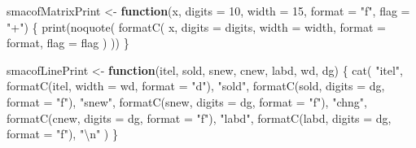 \documentclass[
  12pt,
  letterpaper,
  DIV=11,
  numbers=noendperiod]{scrartcl}
\newenvironment{Shaded}{\begin{snugshade}}{\end{snugshade}}
\newcommand{\AttributeTok}[1]{\textcolor[rgb]{0.40,0.45,0.13}{#1}}
\newcommand{\ControlFlowTok}[1]{\textcolor[rgb]{0.00,0.23,0.31}{\textbf{#1}}}
\newcommand{\DecValTok}[1]{\textcolor[rgb]{0.68,0.00,0.00}{#1}}
\newcommand{\FunctionTok}[1]{\textcolor[rgb]{0.28,0.35,0.67}{#1}}
\newcommand{\NormalTok}[1]{\textcolor[rgb]{0.00,0.23,0.31}{#1}}
\newcommand{\OtherTok}[1]{\textcolor[rgb]{0.00,0.23,0.31}{#1}}
\newcommand{\SpecialCharTok}[1]{\textcolor[rgb]{0.37,0.37,0.37}{#1}}
\newcommand{\StringTok}[1]{\textcolor[rgb]{0.13,0.47,0.30}{#1}}
\begin{document}
\begin{Shaded}
\begin{Highlighting}[]
\NormalTok{smacofMatrixPrint }\OtherTok{\textless{}{-}} \ControlFlowTok{function}\NormalTok{(x,}
                   \AttributeTok{digits =} \DecValTok{10}\NormalTok{,}
                   \AttributeTok{width =} \DecValTok{15}\NormalTok{,}
                   \AttributeTok{format =} \StringTok{"f"}\NormalTok{,}
                   \AttributeTok{flag =} \StringTok{"+"}\NormalTok{) \{}
  \FunctionTok{print}\NormalTok{(}\FunctionTok{noquote}\NormalTok{(}
    \FunctionTok{formatC}\NormalTok{(}
\NormalTok{      x,}
      \AttributeTok{digits =}\NormalTok{ digits,}
      \AttributeTok{width =}\NormalTok{ width,}
      \AttributeTok{format =}\NormalTok{ format,}
      \AttributeTok{flag =}\NormalTok{ flag}
\NormalTok{    )}
\NormalTok{  ))}
\NormalTok{\}}

\NormalTok{smacofLinePrint }\OtherTok{\textless{}{-}} \ControlFlowTok{function}\NormalTok{(itel, sold, snew, cnew, labd, wd, dg) \{}
  \FunctionTok{cat}\NormalTok{(}
    \StringTok{"itel"}\NormalTok{,}
    \FunctionTok{formatC}\NormalTok{(itel, }\AttributeTok{width =}\NormalTok{ wd, }\AttributeTok{format =} \StringTok{"d"}\NormalTok{),}
    \StringTok{"sold"}\NormalTok{,}
    \FunctionTok{formatC}\NormalTok{(sold, }\AttributeTok{digits =}\NormalTok{ dg, }\AttributeTok{format =} \StringTok{"f"}\NormalTok{),}
    \StringTok{"snew"}\NormalTok{,}
    \FunctionTok{formatC}\NormalTok{(snew, }\AttributeTok{digits =}\NormalTok{ dg, }\AttributeTok{format =} \StringTok{"f"}\NormalTok{),}
    \StringTok{"chng"}\NormalTok{,}
    \FunctionTok{formatC}\NormalTok{(cnew, }\AttributeTok{digits =}\NormalTok{  dg, }\AttributeTok{format =} \StringTok{"f"}\NormalTok{),}
    \StringTok{"labd"}\NormalTok{,}
    \FunctionTok{formatC}\NormalTok{(labd, }\AttributeTok{digits =}\NormalTok{  dg, }\AttributeTok{format =} \StringTok{"f"}\NormalTok{),}
    \StringTok{"}\SpecialCharTok{\textbackslash{}n}\StringTok{"}
\NormalTok{  )}
\NormalTok{\}}


\end{Highlighting}
\end{Shaded}
\end{document}
